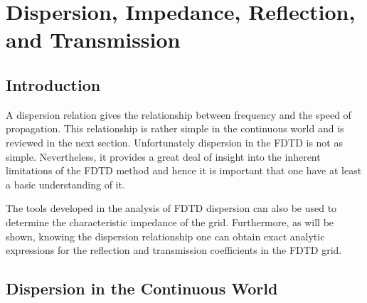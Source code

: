 \chapter{Dispersion, Impedance, Reflection, and Transmission
 \label{chap:dispersion}}


\renewcommand{\thefootnote}{\fnsymbol{footnote}}

\section{Introduction}

A dispersion relation gives the relationship between frequency and
the speed of propagation.  This relationship is rather simple in the
continuous world and is reviewed in the next section.  Unfortunately
dispersion in the FDTD is not as simple.  Nevertheless, it provides a
great deal of insight into the inherent limitations of the FDTD method
and hence it is important that one have at least a basic understanding
of it.

The tools developed in the analysis of FDTD dispersion can also be
used to determine the characteristic impedance of the grid.
Furthermore, as will be shown, knowing the dispersion relationship
one can obtain exact analytic expressions for the reflection and
transmission coefficients in the FDTD grid.

\section{Dispersion in the Continuous World}

